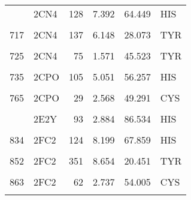 \begin{table}
\begin{tabular}{llrrrl}
			\addlinespace
			712 & 2CN4 & 128 & 7.392 & 64.449 & HIS\\
			\cellcolor{gray!6}{714} & \cellcolor{gray!6}{2CN4} & \cellcolor{gray!6}{133} & \cellcolor{gray!6}{7.798} & \cellcolor{gray!6}{35.290} & \cellcolor{gray!6}{HIS}\\
			717 & 2CN4 & 137 & 6.148 & 28.073 & TYR\\
			\cellcolor{gray!6}{721} & \cellcolor{gray!6}{2CN4} & \cellcolor{gray!6}{55} & \cellcolor{gray!6}{3.374} & \cellcolor{gray!6}{16.581} & \cellcolor{gray!6}{TYR}\\
			725 & 2CN4 & 75 & 1.571 & 45.523 & TYR\\
			\addlinespace
			\cellcolor{gray!6}{729} & \cellcolor{gray!6}{2CN4} & \cellcolor{gray!6}{83} & \cellcolor{gray!6}{3.639} & \cellcolor{gray!6}{61.039} & \cellcolor{gray!6}{HIS}\\
			735 & 2CPO & 105 & 5.051 & 56.257 & HIS\\
			\cellcolor{gray!6}{737} & \cellcolor{gray!6}{2CPO} & \cellcolor{gray!6}{107} & \cellcolor{gray!6}{6.010} & \cellcolor{gray!6}{77.723} & \cellcolor{gray!6}{HIS}\\
			765 & 2CPO & 29 & 2.568 & 49.291 & CYS\\
			\cellcolor{gray!6}{790} & \cellcolor{gray!6}{2E2Y} & \cellcolor{gray!6}{103} & \cellcolor{gray!6}{5.279} & \cellcolor{gray!6}{62.538} & \cellcolor{gray!6}{TYR}\\
			\addlinespace
			826 & 2E2Y & 93 & 2.884 & 86.534 & HIS\\
			\cellcolor{gray!6}{828} & \cellcolor{gray!6}{2E2Y} & \cellcolor{gray!6}{97} & \cellcolor{gray!6}{3.306} & \cellcolor{gray!6}{68.715} & \cellcolor{gray!6}{HIS}\\
			834 & 2FC2 & 124 & 8.199 & 67.859 & HIS\\
			\cellcolor{gray!6}{841} & \cellcolor{gray!6}{2FC2} & \cellcolor{gray!6}{235} & \cellcolor{gray!6}{8.971} & \cellcolor{gray!6}{51.247} & \cellcolor{gray!6}{TYR}\\
			852 & 2FC2 & 351 & 8.654 & 20.451 & TYR\\
			\addlinespace
			\cellcolor{gray!6}{854} & \cellcolor{gray!6}{2FC2} & \cellcolor{gray!6}{353} & \cellcolor{gray!6}{5.379} & \cellcolor{gray!6}{80.273} & \cellcolor{gray!6}{TYR}\\
			863 & 2FC2 & 62 & 2.737 & 54.005 & CYS\\
			\cellcolor{gray!6}{880} & \cellcolor{gray!6}{2IIZ} & \cellcolor{gray!6}{185} & \cellcolor{gray!6}{2.384} & \cellcolor{gray!6}{59.725} & \cellcolor{gray!6}{TYR}\\

\end{tabular}
\end{table}
